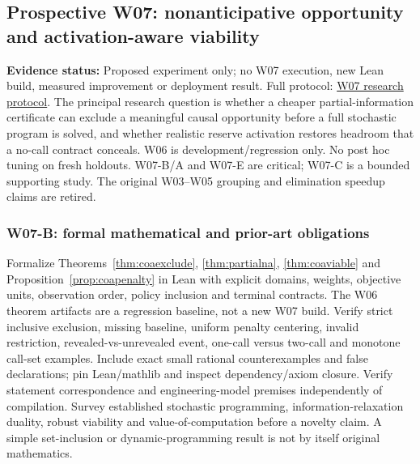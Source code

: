 \documentclass[11pt,letterpaper]{article}
\newcommand{\status}[1]{\textbf{Evidence status:} #1}
\begin{document}
\subsection{Prospective W07: nonanticipative opportunity and activation-aware viability}
\label{sec:w07}
\status{Proposed experiment only; no W07 execution, new Lean build, measured improvement or deployment result. Full protocol: \href{https://chatgpt.com/space/page_bf06b4f554408191a547505cc43f4c4a}{W07 research protocol}.}
The principal research question is whether a cheaper partial-information certificate can exclude a meaningful causal opportunity before a full stochastic program is solved, and whether realistic reserve activation restores headroom that a no-call contract conceals. W06 is development/regression only. No post hoc tuning on fresh holdouts. W07-B/A and W07-E are critical; W07-C is a bounded supporting study. The original W03--W05 grouping and elimination speedup claims are retired.

\subsubsection{W07-B: formal mathematical and prior-art obligations}
Formalize Theorems~\ref{thm:coaexclude}, \ref{thm:partialna}, \ref{thm:coaviable} and Proposition~\ref{prop:coapenalty} in Lean with explicit domains, weights, objective units, observation order, policy inclusion and terminal contracts. The W06 theorem artifacts are a regression baseline, not a new W07 build. Verify strict inclusive exclusion, missing baseline, uniform penalty centering, invalid restriction, revealed-vs-unrevealed event, one-call versus two-call and monotone call-set examples. Include exact small rational counterexamples and false declarations; pin Lean/mathlib and inspect dependency/axiom closure. Verify statement correspondence and engineering-model premises independently of compilation. Survey established stochastic programming, information-relaxation duality, robust viability and value-of-computation before a novelty claim. A simple set-inclusion or dynamic-programming result is not by itself original mathematics.
\end{document}
